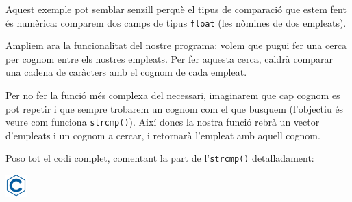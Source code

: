 \documentclass[
]{book}
\begin{document}
Aquest exemple pot semblar senzill perquè el tipus de comparació que estem fent és numèrica: comparem dos camps de tipus \texttt{float} (les nòmines de dos empleats).

Ampliem ara la funcionalitat del nostre programa: volem que pugui fer una cerca per cognom entre els nostres empleats. Per fer aquesta cerca, caldrà comparar una cadena de caràcters amb el cognom de cada empleat.

Per no fer la funció més complexa del necessari, imaginarem que cap cognom es pot repetir i que sempre trobarem un cognom com el que busquem (l'objectiu és veure com funciona \texttt{strcmp()}). Així doncs la nostra funció rebrà un vector d'empleats i un cognom a cercar, i retornarà l'empleat amb aquell cognom.

Poso tot el codi complet, comentant la part de l'\texttt{strcmp()} detalladament:

\includegraphics{./img/c.png}
\end{document}
